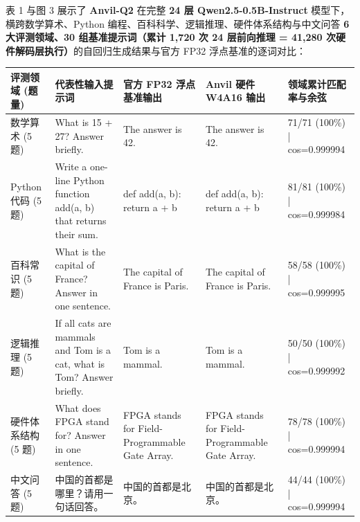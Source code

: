 \documentclass[11pt,a4paper]{article}
\begin{document}
表 1 与图 3 展示了 \textbf{Anvil-Q2} 在完整 \textbf{24 层 Qwen2.5-0.5B-Instruct} 模型下，横跨数学算术、Python 编程、百科科学、逻辑推理、硬件体系结构与中文问答 \textbf{6 大评测领域、30 组基准提示词（累计 1,720 次 24 层前向推理 = 41,280 次硬件解码层执行）}的自回归生成结果与官方 FP32 浮点基准的逐词对比：

{\footnotesize\renewcommand{\arraystretch}{1.14}\begin{longtable}{@{}L{0.15\textwidth}L{0.2\textwidth}L{0.19\textwidth}L{0.19\textwidth}L{0.17\textwidth}@{}}\toprule

\textbf{评测领域 (\allowbreak{}题量)\allowbreak{}} & \textbf{代表性输入提示词} & \textbf{官方 FP32 浮点基准输出} & \textbf{Anvil 硬件 W4A16 输出} & \textbf{领域累计匹配率与余弦}\\\midrule\endhead

数学算术 (\allowbreak{}5 题)\allowbreak{} & What is 15 +\allowbreak{} 27? Answer briefly. & The answer is 42. & The answer is 42. & 71/\allowbreak{}71 (\allowbreak{}100\%)\allowbreak{} | cos=\allowbreak{}0.999994\\[2pt]

Python代码 (\allowbreak{}5 题)\allowbreak{} & Write a one-line Python function add(\allowbreak{}a,\allowbreak{} b)\allowbreak{} that returns their sum. & def add(\allowbreak{}a,\allowbreak{} b)\allowbreak{}:     return a +\allowbreak{} b & def add(\allowbreak{}a,\allowbreak{} b)\allowbreak{}:     return a +\allowbreak{} b & 81/\allowbreak{}81 (\allowbreak{}100\%)\allowbreak{} | cos=\allowbreak{}0.999984\\[2pt]

百科常识 (\allowbreak{}5 题)\allowbreak{} & What is the capital of France? Answer in one sentence. & The capital of France is Paris. & The capital of France is Paris. & 58/\allowbreak{}58 (\allowbreak{}100\%)\allowbreak{} | cos=\allowbreak{}0.999995\\[2pt]

逻辑推理 (\allowbreak{}5 题)\allowbreak{} & If all cats are mammals and Tom is a cat,\allowbreak{} what is Tom? Answer briefly. & Tom is a mammal. & Tom is a mammal. & 50/\allowbreak{}50 (\allowbreak{}100\%)\allowbreak{} | cos=\allowbreak{}0.999992\\[2pt]

硬件体系结构 (\allowbreak{}5 题)\allowbreak{} & What does FPGA stand for? Answer in one sentence. & FPGA stands for Field-Programmable Gate Array. & FPGA stands for Field-Programmable Gate Array. & 78/\allowbreak{}78 (\allowbreak{}100\%)\allowbreak{} | cos=\allowbreak{}0.999994\\[2pt]

中文问答 (\allowbreak{}5 题)\allowbreak{} & 中国的首都是哪里？请用一句话回答。 & 中国的首都是北京。 & 中国的首都是北京。 & 44/\allowbreak{}44 (\allowbreak{}100\%)\allowbreak{} | cos=\allowbreak{}0.999994\\[2pt]

\bottomrule\end{longtable}}
\end{document}

